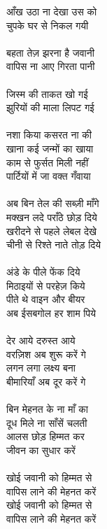 {{{{{{{{{{{{{{{{{{{{{{{{{{{{{{{{{{{{{{{आँख उठा ना देखा उस को\\
चुपके घर से निकल गयी\\
\\
बहता तेज़ झरना है जवानी\\
वापिस ना आए गिरता पानी\\
\\
जिस्म की ताकत खो गई\\
झुरियों की माला लिपट गई\\
\\
नशा किया कसरत ना की\\
खाना कई जन्मों का खाया\\
काम से फुर्सत मिली नहीं\\
पार्टियों में जा वक्त गँवाया\\
\\
अब बिन तेल की सब्ज़ी माँगे\\
मक्खन लदे पराँठे छोड़ दिये\\
खरीदने से पहले लेबल देखे\\
चीनी से रिश्ते नाते तोड़ दिये\\
\\
अंडे के पीले फेंक दिये\\
मिठाइयों से परहेज़ किये\\
पीते थे वाइन और बीयर\\
अब ईसबगोल हर शाम पिये\\
\\
देर आये दरुस्त आये\\
वरज़िश अब शुरू करें गे\\
लगन लगा लक्ष्य बना\\
बीमारियाँ अब दूर करें गे\\
\\
बिन मेहनत के ना माँ का\\
दूध मिले ना साँसें चलती\\
आलस छोड़ हिम्मत कर\\
जीवन का सुधार करें\\
\\
खोई जवानी को हिम्मत से\\
वापिस लाने की मेहनत करें\\
खोई जवानी को हिम्मत से\\
वापिस लाने की मेहनत करें\\
\\
\\
\\
\\
\\
\\
\\
}}}}}}}}}}}}}}}}}}}}}}}}}}}}}}}}}}}}}}}
